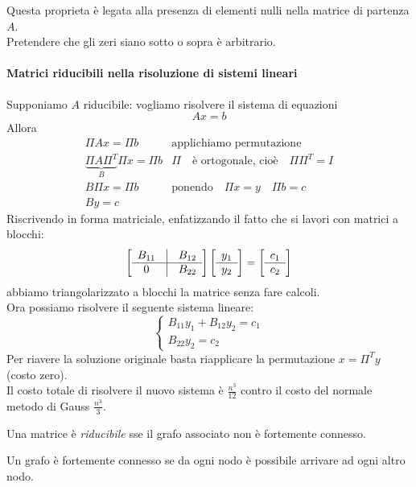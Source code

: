 Questa proprieta \`e legata alla presenza di elementi nulli nella matrice di
 partenza $A$.\\
Pretendere che gli zeri siano sotto o sopra \`e arbitrario.\\

\paragraph{Matrici riducibili nella risoluzione di sistemi lineari}
Supponiamo $A$ riducibile: vogliamo risolvere il sistema di equazioni
$$Ax = b$$
Allora  
$$
\begin{array}{ll}
\Pi A x = \Pi b & \text{applichiamo permutazione} \\
\underbrace{\Pi A \Pi^{T}}_{B} \Pi x = \Pi b & 
\Pi \quad \text{\`e ortogonale, cio\`e} \quad \Pi \Pi ^{T} = I \\
B \Pi x = \Pi b & \text{ponendo} \quad \Pi x = y \quad \Pi b = c \\
B y = c
\end{array}
$$
Riscrivendo in forma matriciale, enfatizzando il fatto che si lavori
con matrici a blocchi:
$$
\left[
  \begin{array}{ccc}
    B_{11} & \vline & B_{12} \\
    \hline                    
    0      & \vline & B_{22}   
  \end{array}
\right]
\left[
  \begin{array}{c}
    y_1  \\
    \hline
    y_2 
  \end{array}
\right]
=
\left[
  \begin{array}{c}
    c_1  \\
    \hline
    c_2 
  \end{array}
\right]
$$
abbiamo triangolarizzato a blocchi la matrice senza fare calcoli.\\
Ora possiamo risolvere il seguente sistema lineare:
$$
\left\{
  \begin{array}{ll}
    B_{11}y_1 + B_{12}y_2 = c_1 \\
    B_{22}y_{2} = c_2           
  \end{array}
\right.
$$
Per riavere la soluzione originale basta riapplicare la permutazione
$x = \Pi^T y$ (costo zero).\\
Il costo totale di risolvere il nuovo sistema \`e $\frac{n^3}{12}$
contro il costo del normale metodo di Gauss $\frac{n^3}{3}$.

\begin{theo}
Una matrice \`e \emph{riducibile} sse il grafo associato non \`e fortemente
 connesso.
\end{theo}
Un grafo \`e fortemente connesso se da ogni nodo \`e possibile arrivare
 ad ogni altro nodo.
 
